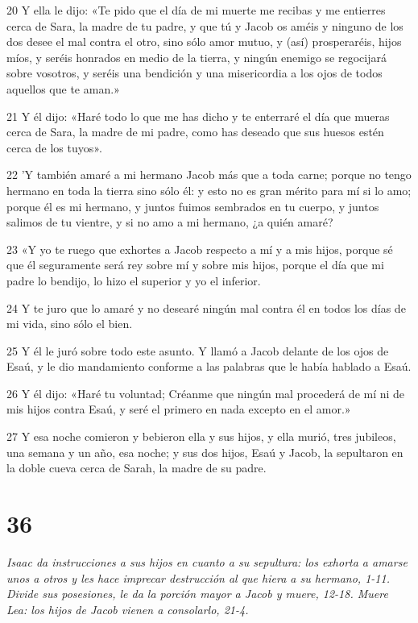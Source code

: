 \par 20 Y ella le dijo: «Te pido que el día de mi muerte me recibas y me entierres cerca de Sara, la madre de tu padre, y que tú y Jacob os améis y ninguno de los dos desee el mal contra el otro, sino sólo amor mutuo, y (así) prosperaréis, hijos míos, y seréis honrados en medio de la tierra, y ningún enemigo se regocijará sobre vosotros, y seréis una bendición y una misericordia a los ojos de todos aquellos que te aman.»
\par 21 Y él dijo: «Haré todo lo que me has dicho y te enterraré el día que mueras cerca de Sara, la madre de mi padre, como has deseado que sus huesos estén cerca de los tuyos».
\par 22 'Y también amaré a mi hermano Jacob más que a toda carne; porque no tengo hermano en toda la tierra sino sólo él: y esto no es gran mérito para mí si lo amo; porque él es mi hermano, y juntos fuimos sembrados en tu cuerpo, y juntos salimos de tu vientre, y si no amo a mi hermano, ¿a quién amaré?
\par 23 «Y yo te ruego que exhortes a Jacob respecto a mí y a mis hijos, porque sé que él seguramente será rey sobre mí y sobre mis hijos, porque el día que mi padre lo bendijo, lo hizo el superior y yo el inferior.
\par 24 Y te juro que lo amaré y no desearé ningún mal contra él en todos los días de mi vida, sino sólo el bien.
\par 25 Y él le juró sobre todo este asunto. Y llamó a Jacob delante de los ojos de Esaú, y le dio mandamiento conforme a las palabras que le había hablado a Esaú.
\par 26 Y él dijo: «Haré tu voluntad; Créanme que ningún mal procederá de mí ni de mis hijos contra Esaú, y seré el primero en nada excepto en el amor.»
\par 27 Y esa noche comieron y bebieron ella y sus hijos, y ella murió, tres jubileos, una semana y un año, esa noche; y sus dos hijos, Esaú y Jacob, la sepultaron en la doble cueva cerca de Sarah, la madre de su padre.

\chapter{36}

\par \textit{Isaac da instrucciones a sus hijos en cuanto a su sepultura: los exhorta a amarse unos a otros y les hace imprecar destrucción al que hiera a su hermano, 1-11. Divide sus posesiones, le da la porción mayor a Jacob y muere, 12-18. Muere Lea: los hijos de Jacob vienen a consolarlo, 21-4.}

